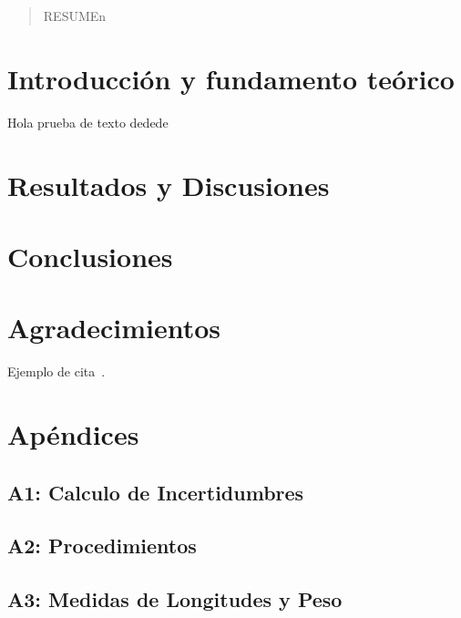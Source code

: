 \documentclass[10pt,onecolumn]{article}
\begin{document}

\tableofcontents %
\newpage

\HRule{0.5pt} %

\begin{abstract}
RESUMEn
\end{abstract}


\section{Introducción y fundamento teórico}
Hola prueba de texto dedede

\section{Resultados y Discusiones}

\section{Conclusiones}

\section{Agradecimientos}
Ejemplo de cita~\cite{Mandelbrot2009}.


\section{Apéndices}
\subsection{A1: Calculo de Incertidumbres} 


\subsection{A2: Procedimientos}

\subsection{A3: Medidas de Longitudes y Peso }


\end{document}
